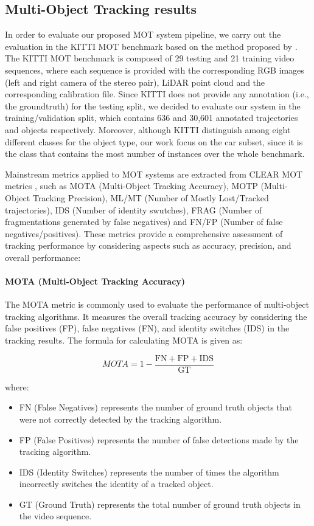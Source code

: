 \subsection{Multi-Object Tracking results}
\label{sec:5_mot_results}

In order to evaluate our proposed \ac{MOT} system pipeline, we carry out the evaluation in the KITTI \ac{MOT} benchmark based on the method proposed by \cite{weng20203d}. The KITTI MOT benchmark is composed of 29 testing and 21 training video sequences, where each sequence is provided with the corresponding RGB images (left and right camera of the stereo pair), LiDAR point cloud and the corresponding calibration file. Since KITTI does not provide any annotation (i.e., the groundtruth) for the testing split, we decided to evaluate our system in the training/validation split, which contains 636 and 30,601 annotated trajectories and objects respectively. Moreover, although KITTI distinguish among eight different classes for the object type, our work focus on the car subset, since it is the class that contains the most number of instances over the whole benchmark.

Mainstream metrics applied to MOT systems are extracted from CLEAR MOT metrics \cite{bernardin2008evaluating}, such as MOTA (Multi-Object Tracking Accuracy), MOTP (Multi-Object Tracking Precision), ML/MT (Number of Mostly Lost/Tracked trajectories), IDS (Number of identity swutches), FRAG (Number of fragmentations generated by false negatives) and FN/FP (Number of false negatives/positives). These metrics provide a comprehensive assessment of tracking performance by considering aspects such as accuracy, precision, and overall performance:

\paragraph{MOTA (Multi-Object Tracking Accuracy)}
	
The MOTA metric is commonly used to evaluate the performance of multi-object tracking algorithms. It measures the overall tracking accuracy by considering the false positives (FP), false negatives (FN), and identity switches (IDS) in the tracking results. The formula for calculating MOTA is given as:

\begin{equation}
MOTA = 1 - \frac{{\text{{FN}} + \text{{FP}} + \text{{IDS}}}}{{\text{{GT}}}}
\end{equation}

where:
\begin{itemize}
	\item FN (False Negatives) represents the number of ground truth objects that were not correctly detected by the tracking algorithm.
	\item FP (False Positives) represents the number of false detections made by the tracking algorithm.
	\item IDS (Identity Switches) represents the number of times the algorithm incorrectly switches the identity of a tracked object.
	\item GT (Ground Truth) represents the total number of ground truth objects in the video sequence.
\end{itemize}

